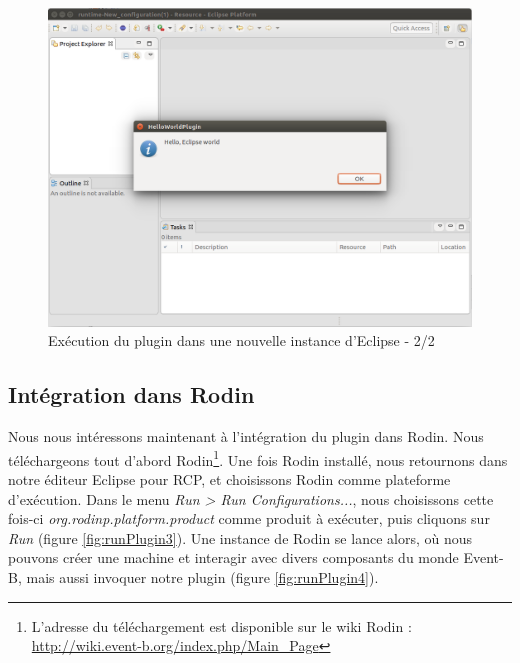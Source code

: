 \begin{figure}[H]
    \centering

    \includegraphics{pictures/runPlugin3.png}

    \caption{Exécution du plugin dans une nouvelle instance d'Eclipse - 2/2}
    \label{fig:runPlugin2}
\end{figure}


\subsection{Intégration dans Rodin}

Nous nous intéressons maintenant à l'intégration du plugin dans Rodin.
Nous téléchargeons tout d'abord Rodin\footnote{%
L'adresse du téléchargement est disponible sur le wiki Rodin : \href{http://wiki.event-b.org/index.php/Main\_Page}{http://wiki.event-b.org/index.php/Main\_Page}}.
Une fois Rodin installé, nous retournons dans notre éditeur Eclipse pour RCP, et choisissons Rodin comme plateforme d'exécution.
Dans le menu \textit{Run > Run Configurations...}, nous choisissons cette fois-ci \textit{org.rodinp.platform.product} comme produit à exécuter, %
puis cliquons sur \textit{Run} (figure \ref{fig:runPlugin3}).
Une instance de Rodin se lance alors, où nous pouvons créer une machine et interagir avec divers composants du monde Event-B, mais aussi %
invoquer notre plugin (figure \ref{fig:runPlugin4}).

